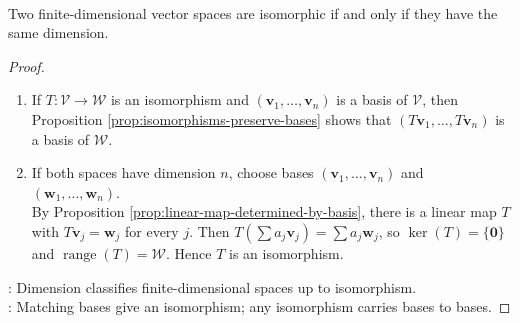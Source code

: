 \begin{theorem} \label{thm:finite-dimensional-isomorphic-iff-same-dimension} \\
Two finite-dimensional vector spaces are isomorphic if and only if they have the same dimension.
\begin{proof}
\begin{enumerate}[label=\roman*.]
\setlength{\itemsep}{0pt}
\item[$(\Rightarrow)$] If $T:\mathcal{V}\to\mathcal{W}$ is an isomorphism and $(\mathbf{v}_1,\ldots,\mathbf{v}_n)$ is a basis of $\mathcal{V}$, then Proposition \ref{prop:isomorphisms-preserve-bases} shows that $(T\mathbf{v}_1,\ldots,T\mathbf{v}_n)$ is a basis of $\mathcal{W}$.
\item[$(\Leftarrow)$] If both spaces have dimension $n$, choose bases $(\mathbf{v}_1,\ldots,\mathbf{v}_n)$ and $(\mathbf{w}_1,\ldots,\mathbf{w}_n)$.\\
By Proposition \ref{prop:linear-map-determined-by-basis}, there is a linear map $T$ with $T\mathbf{v}_j=\mathbf{w}_j$ for every $j$. Then $T(\sum a_j\mathbf{v}_j)=\sum a_j\mathbf{w}_j$, so $\ker(T)=\{\mathbf{0}\}$ and $\operatorname{range}(T)=\mathcal{W}$. Hence $T$ is an isomorphism.
\end{enumerate}
: Dimension classifies finite-dimensional spaces up to isomorphism.\\
: Matching bases give an isomorphism; any isomorphism carries bases to bases.
\end{proof}
\end{theorem}

